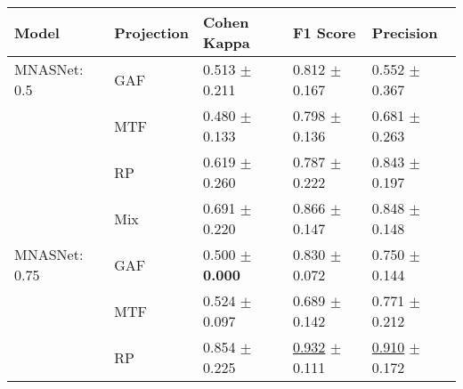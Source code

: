 
\begin{tabular}{lllll}
\toprule
Model & Projection & Cohen Kappa & F1 Score & Precision \\
\midrule
MNASNet: 0.5 & GAF & \textcolor[rgb]{0.9262152778,0.0737847222,0}{0.513} $\pm$ \textcolor[rgb]{0.7080678936,0.2919321064,0}{0.211} & \textcolor[rgb]{0.5381165919,0.4618834081,0}{0.812} $\pm$ \textcolor[rgb]{0.5971660531,0.4028339469,0}{0.167} & \textcolor[rgb]{1.0000000000,0.0000000000,0}{0.552} $\pm$ \textcolor[rgb]{0.7965410773,0.2034589227,0}{0.367} \\
 & MTF & \textcolor[rgb]{1.0000000000,0.0000000000,0}{0.480} $\pm$ \textcolor[rgb]{0.4448004357,0.5000000000,0}{0.133} & \textcolor[rgb]{0.5911129230,0.4088870770,0}{0.798} $\pm$ \textcolor[rgb]{0.4190016102,0.5000000000,0}{0.136} & \textcolor[rgb]{0.6725663717,0.3274336283,0}{0.681} $\pm$ \textcolor[rgb]{0.4752162039,0.5000000000,0}{0.263} \\
 & RP & \textcolor[rgb]{0.6811342593,0.3188657407,0}{0.619} $\pm$ \textcolor[rgb]{0.8705171556,0.1294828444,0}{0.260} & \textcolor[rgb]{0.6327852516,0.3672147484,0}{0.787} $\pm$ \textcolor[rgb]{0.9160861823,0.0839138177,0}{0.222} & \textcolor[rgb]{0.2595870206,0.5000000000,0}{0.843} $\pm$ \textcolor[rgb]{0.2721920318,0.5000000000,0}{0.197} \\
 & Mix & \textcolor[rgb]{0.5173611111,0.4826388889,0}{0.691} $\pm$ \textcolor[rgb]{0.7376661777,0.2623338223,0}{0.220} & \textcolor[rgb]{0.3334692214,0.5000000000,0}{0.866} $\pm$ \textcolor[rgb]{0.4801073549,0.5000000000,0}{0.147} & \textcolor[rgb]{0.2445695897,0.5000000000,0}{0.848} $\pm$ \textcolor[rgb]{0.1202871709,0.5000000000,0}{0.148} \\
MNASNet: 0.75 & GAF & \textcolor[rgb]{0.9548611111,0.0451388889,0}{0.500} $\pm$ \textbf{\textcolor[rgb]{0.0000000000,0.5000000000,0}{0.000}} & \textcolor[rgb]{0.4702114029,0.5000000000,0}{0.830} $\pm$ \textcolor[rgb]{0.0466573321,0.5000000000,0}{0.072} & \textcolor[rgb]{0.4955752212,0.5000000000,0}{0.750} $\pm$ \textcolor[rgb]{0.1082889146,0.5000000000,0}{0.144} \\
 & MTF & \textcolor[rgb]{0.9007523148,0.0992476852,0}{0.524} $\pm$ \textcolor[rgb]{0.3253529221,0.5000000000,0}{0.097} & \textcolor[rgb]{1.0000000000,0.0000000000,0}{0.689} $\pm$ \textcolor[rgb]{0.4554998381,0.5000000000,0}{0.142} & \textcolor[rgb]{0.4424778761,0.5000000000,0}{0.771} $\pm$ \textcolor[rgb]{0.3187149609,0.5000000000,0}{0.212} \\
 & RP & \textcolor[rgb]{0.1432291667,0.5000000000,0}{0.854} $\pm$ \textcolor[rgb]{0.7546426383,0.2453573617,0}{0.225} & \underline{\textcolor[rgb]{0.0866965620,0.5000000000,0}{0.932}} $\pm$ \textcolor[rgb]{0.2745659800,0.5000000000,0}{0.111} & \underline{\textcolor[rgb]{0.0884955752,0.5000000000,0}{0.910}} $\pm$ \textcolor[rgb]{0.1940527150,0.5000000000,0}{0.172} \\

\end{tabular}
